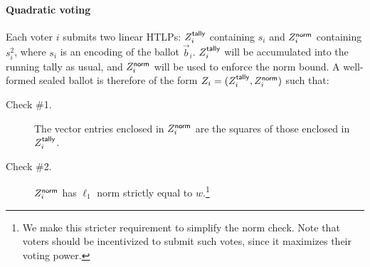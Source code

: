 

% 

%
% 

\paragraph{Quadratic voting~\cite{LalWey18}}

Each voter $i$ submits two linear HTLPs: $Z_i^{\sf tally}$ containing $s_i$ and $Z_i^{\sf norm}$ containing $s_i^2$, where $s_i$ is an encoding of the ballot $\vec{b}_i$. $Z_i^{\sf tally}$ will be accumulated into the running tally as usual, and $Z_i^{\sf norm}$ will be used to enforce the norm bound. A well-formed sealed ballot is therefore of the form $Z_i = (Z_i^{\sf tally}, Z_i^{\sf norm})$ such that:
\begin{description}
    \item[Check \#1.] The vector entries enclosed in $Z_i^{\sf norm}$ are the squares of those enclosed in $Z_i^{\sf tally}$.
    \item[Check \#2.] $Z_i^{\sf norm}$ has $\ell_1$ norm strictly equal to $w$.\footnote{We make this stricter requirement to simplify the norm check. Note that voters should be incentivized to submit such votes, since it maximizes their voting power.}
\end{description}


